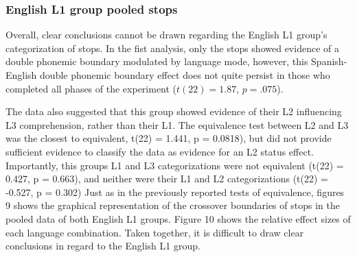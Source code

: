\documentclass[
  english,
  man]{apa6}
\begin{document}
\hypertarget{english-l1-group-pooled-stops}{%
\subsubsection{English L1 group pooled stops}\label{english-l1-group-pooled-stops}}

Overall, clear conclusions cannot be drawn regarding the English L1 group's categorization of stops.
In the fist analysis, only the stops showed evidence of a double phonemic boundary modulated by language mode, however, this Spanish-English double phonemic boundary effect does not quite persist in those who completed all phases of the experiment (\(t(22) = 1.87\), \(p = .075\)).

The data also suggested that this group showed evidence of their L2 influencing L3 comprehension, rather than their L1. The equivalence test between L2 and L3 was the closest to equivalent, t(22) = 1.441, p = 0.0818), but did not provide sufficient evidence to classify the data as evidence for an L2 status effect.
Importantly, this groups L1 and L3 categorizations were not equivalent (t(22) = 0.427, p = 0.663), and neither were their L1 and L2 categorizations (t(22) = -0.527, p = 0.302)
Just as in the previously reported tests of equivalence, figures 9 shows the graphical representation of the crossover boundaries of stops in the pooled data of both English L1 groups.
Figure 10 shows the relative effect sizes of each language combination.
Taken together, it is difficult to draw clear conclusions in regard to the English L1 group.
\end{document}
